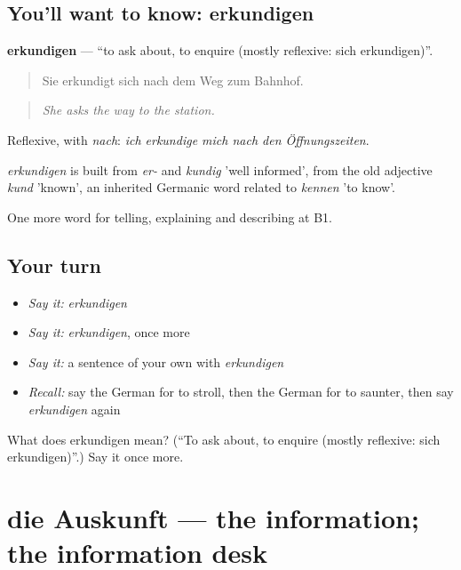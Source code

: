 \subsection*{You'll want to know: erkundigen}
\textbf{erkundigen} — \textquotedblleft{}to ask about, to enquire (mostly reflexive: sich erkundigen)\textquotedblright{}.

\begin{quote}
Sie erkundigt sich nach dem Weg zum Bahnhof.
\end{quote}

\begin{quote}
\emph{She asks the way to the station.}
\end{quote}

Reflexive, with \emph{nach}: \emph{ich erkundige mich nach den Öffnungszeiten}.

\begin{cousinweb}
\emph{erkundigen} is built from \emph{er-} and \emph{kundig} 'well informed', from the old adjective \emph{kund} 'known', an inherited Germanic word related to \emph{kennen} 'to know'.
\end{cousinweb}

\begin{grammarlens}[title={What you've built}]
One more word for telling, explaining and describing at B1.
\end{grammarlens}

\subsection*{Your turn}
\begin{itemize}
\raggedright
  \item \emph{Say it:} \emph{erkundigen}
  \item \emph{Say it:} \emph{erkundigen}, once more
  \item \emph{Say it:} a sentence of your own with \emph{erkundigen}
  \item \emph{Recall:} say the German for to stroll, then the German for to saunter, then say \emph{erkundigen} again
\end{itemize}

\begin{tcolorbox}[breakable,colback=teal!4,colframe=teal!35!black,title={Before you move on}]
What does erkundigen mean? (\textquotedblleft{}To ask about, to enquire (mostly reflexive: sich erkundigen)\textquotedblright{}.) Say it once more.
\end{tcolorbox}
\section[die Auskunft]{die Auskunft — the information; the information desk}

